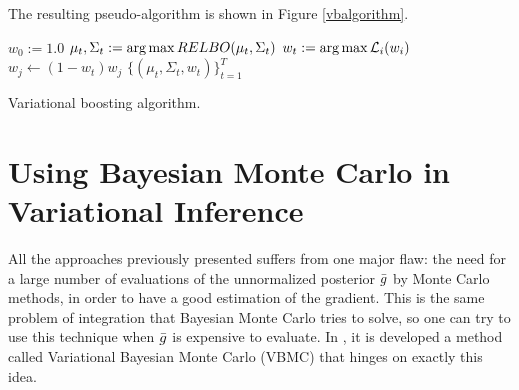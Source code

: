 The resulting pseudo-algorithm is shown in Figure \ref{vbalgorithm}.
\begin{Algorithm}
\begin{algorithmic}[1]\label{vbalgorithm}
\State $w_0 := 1.0$
	\State $\mu_{t},\Sigma_{t} := \operatorname*{arg\,max} RELBO(\mu_{t},\Sigma_{t})$ 
	\State $w_{t} := \operatorname*{arg\,max} \mathcal{L}_i(w_i)$ 
		\State $w_{j} \gets (1-w_t)w_j$
	\EndFor
\EndFor
\State \Return $\{(\mu_t,\Sigma_t,w_t)\}_{t=1}^T$
\EndProcedure
\end{algorithmic}
\caption{\label{vbalgorithm}Variational boosting algorithm.}
\end{Algorithm}

\section{Using Bayesian Monte Carlo in Variational Inference}\label{vbmc_section}

All the approaches previously presented suffers from one major flaw: the need for a large number of evaluations of the unnormalized posterior ${\bar{g}}$ by Monte Carlo methods, in order to have a good estimation of the gradient. This is the same problem of integration that Bayesian Monte Carlo tries to solve, so one can try to use this technique when ${\bar{g}}$ is expensive to evaluate. In \cite{Acerbi_2018}, it is developed a method called Variational Bayesian Monte Carlo (VBMC) that hinges on exactly this idea.

